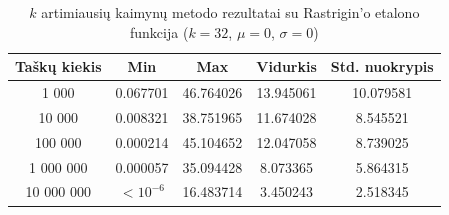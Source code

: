 \begin{table}[H]
    \centering
    \begin{tabular}{|c|c|c|c|c|}
        \hline
        \textbf{Taškų kiekis} & \textbf{Min} & \textbf{Max} & \textbf{Vidurkis} & \textbf{Std. nuokrypis} \\ \hline
        1 000        & 0.067701 & 46.764026 & 13.945061 & 10.079581 \\ \hline
        10 000       & 0.008321 & 38.751965 & 11.674028 & 8.545521 \\ \hline
        100 000      & 0.000214 & 45.104652 & 12.047058 & 8.739025 \\ \hline
        1 000 000    & 0.000057 & 35.094428 & 8.073365 & 5.864315 \\ \hline
        10 000 000   & $<10^{-6}$ & 16.483714 & 3.450243 & 2.518345 \\ \hline
    \end{tabular}
    \caption{$k$ artimiausių kaimynų metodo rezultatai su Rastrigin'o etalono funkcija ($k = 32$, $\mu = 0$, $\sigma = 0$)}
\end{table}